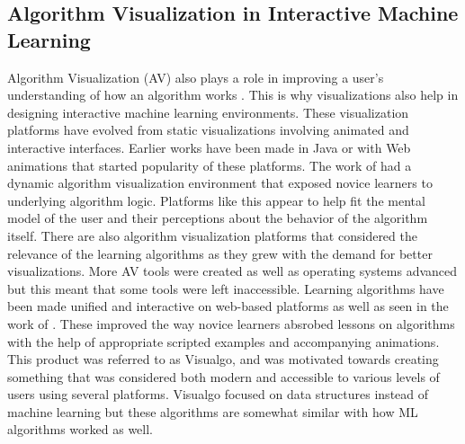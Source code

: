 \documentclass{sigchi}
\begin{document}
\subsection{Algorithm Visualization in Interactive Machine Learning}
Algorithm Visualization (AV) also plays a role in improving a user's understanding of how an algorithm works \cite{shaffer2010algorithm}. This is why visualizations also help in designing interactive machine learning environments. These visualization platforms have evolved from static visualizations involving animated and interactive interfaces. Earlier works have been made in Java or with Web animations that started popularity of these platforms. The work of \cite{vrachnos2008dave} had a dynamic algorithm visualization environment that exposed novice learners to underlying algorithm logic. Platforms like this appear to help fit the mental model of the user and their perceptions about the behavior of the algorithm itself. There are also algorithm visualization platforms that considered the relevance of the learning algorithms as they grew with the demand for better visualizations. More AV tools were created as well as operating systems advanced but this meant that some tools were left inaccessible. Learning algorithms have been made unified and interactive on web-based platforms as well as seen in the work of \cite{halim2012learning}. These improved the way novice learners absrobed lessons on algorithms with the help of appropriate scripted examples and accompanying animations. This product was referred to as Visualgo,  and was motivated towards creating something that was considered both modern and accessible to various levels of users using several platforms. Visualgo focused on data structures instead of machine learning but these algorithms are somewhat similar with how ML algorithms worked as well. 
\end{document}
